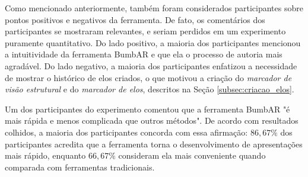 \documentclass[../main.tex]{subfiles}
\begin{document}
Como mencionado anteriormente, também foram considerados participantes sobre pontos positivos e negativos da ferramenta. De fato, os comentários dos participantes se mostraram relevantes, e seriam perdidos em um experimento puramente quantitativo. Do lado positivo, a maioria dos participantes mencionou a intuitividade da ferramenta BumbAR e que ela o processo de autoria mais agradável. Do lado negativo, a maioria dos participantes enfatizou a necessidade de mostrar o histórico de elos criados, o que motivou a criação do \emph{marcador de visão estrutural} e do \emph{marcador de elos}, descritos na Seção \ref{subsec:criacao_elos}.

Um dos participantes do experimento comentou que a ferramenta BumbAR "é mais rápida e menos complicada que outros métodos". De acordo com resultados colhidos, a maioria dos participantes concorda com essa afirmação: $86,67\%$ dos participantes acredita que a ferramenta torna o desenvolvimento de apresentações mais rápido, enquanto $66,67\%$ consideram ela mais conveniente quando comparada com ferramentas tradicionais.
\end{document}
